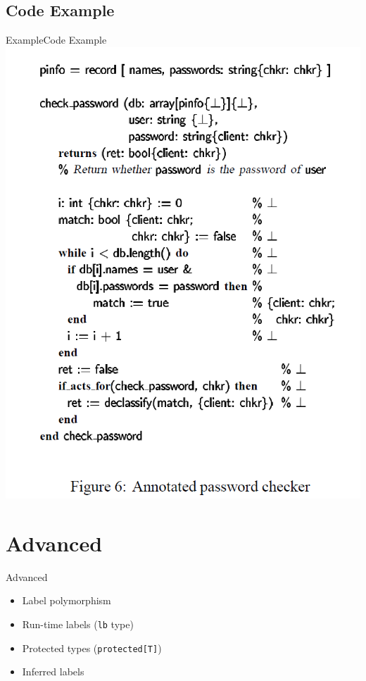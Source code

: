 \documentclass[10pt]{beamer}
\begin{document}
\subsection{Code Example}
\begin{frame}{Example}{Code Example}
	\centering
	\includegraphics[height=.7\paperheight]{passwordcheker_example.png}
\end{frame}

\section{Advanced}
\begin{frame}{Advanced}{}
	\begin{itemize}
		\item Label polymorphism
		\item Run-time labels (\texttt{lb} type)
		\item Protected types (\texttt{protected[T]})
		\item Inferred labels
	\end{itemize}
\end{frame}
\end{document}
